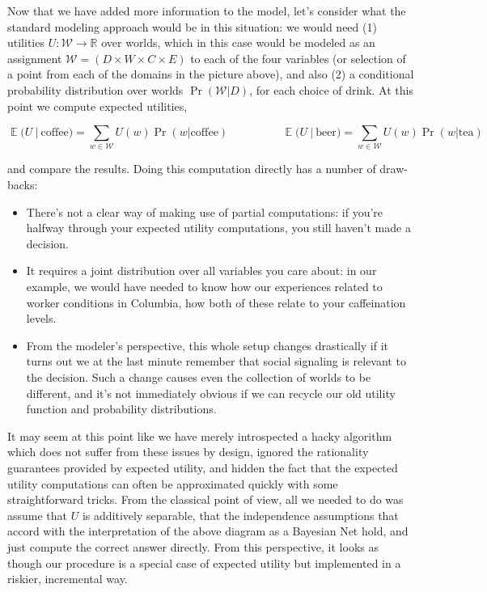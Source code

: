 \documentclass{article}
\theoremstyle{plain}
\theoremstyle{definition}
\theoremstyle{remark}
\begin{document}
	
	Now that we have added more information to the model, let's consider what the standard modeling approach would be in this situation: we would need (1) utilities $U : \mathcal W \to \mathbb R$ over worlds, which in this case would be modeled as an assignment $\mathcal W = (D \times W \times C \times E)$ to each of the four variables (or selection of a point from each of the domains in the picture above), and also (2) a conditional probability distribution over worlds $\Pr(\mathcal W | D)$, for each choice of drink. At this point we compute expected utilities,
	
	\[  \mathop{\mathbb E} \Big(U ~\Big|~ \text{coffee}\Big) = \sum\limits_{w \in \mathcal W} U(w) \Pr(w | \mathrm{coffee}) 
	\hspace{2cm} 
	\mathop{\mathbb E} \Big(U ~\Big|~ \text{beer}\Big) = \sum\limits_{w \in \mathcal W} U(w) \Pr(w | \mathrm{tea}) \]
	
	and compare the results. Doing this computation directly has a number of draw-backs:
	\begin{itemize}[nosep]
		\item There's not a clear way of making use of partial computations: if you're halfway through your expected utility computations, you still haven't made a decision.
		\item It requires a joint distribution over all variables you care about: in our example, we would have needed to know how our experiences related to worker conditions in Columbia, how both of these relate to your caffeination levels.
		
		\item From the modeler's perspective, this whole setup changes drastically if it turns out we at the last minute remember that social signaling is relevant to the decision. Such a change causes even the collection of worlds to be different, and it's not immediately obvious if we can recycle our old utility function and probability distributions.
		
	\end{itemize}
	
	It may seem at this point like we have merely introspected a hacky algorithm which does not suffer from these issues by design, ignored the rationality guarantees provided by expected utility, and hidden the fact that the expected utility computations can often be approximated quickly with some straightforward tricks. From the classical point of view, all we needed to do was assume that $U$ is additively separable, that the independence assumptions that accord with the interpretation of the above diagram as a Bayesian Net hold, and just compute the correct answer directly. From this perspective, it looks as though our procedure is a special case of expected utility but implemented in a riskier, incremental way. 
	
\end{document}
